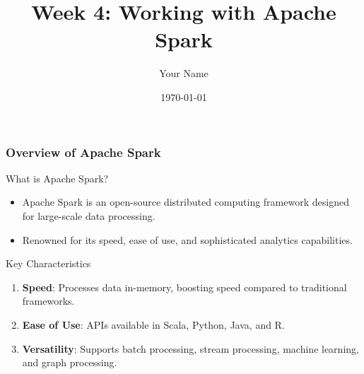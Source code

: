 \documentclass{beamer}
\title{Week 4: Working with Apache Spark}
\author{Your Name}
\institute{Your Institution}
\date{\today}
\begin{document}
\frame{\titlepage}

\begin{frame}[fragile]
    \titlepage
\end{frame}

\begin{frame}[fragile]
    \frametitle{Overview of Apache Spark}
    
    \begin{block}{What is Apache Spark?}
        \begin{itemize}
            \item Apache Spark is an open-source distributed computing framework designed for large-scale data processing.
            \item Renowned for its speed, ease of use, and sophisticated analytics capabilities.
        \end{itemize}
    \end{block}
    
    \begin{block}{Key Characteristics}
        \begin{enumerate}
            \item \textbf{Speed}: Processes data in-memory, boosting speed compared to traditional frameworks.
            \item \textbf{Ease of Use}: APIs available in Scala, Python, Java, and R.
            \item \textbf{Versatility}: Supports batch processing, stream processing, machine learning, and graph processing.
        \end{enumerate}
    \end{block}
\end{frame}
\end{document}
